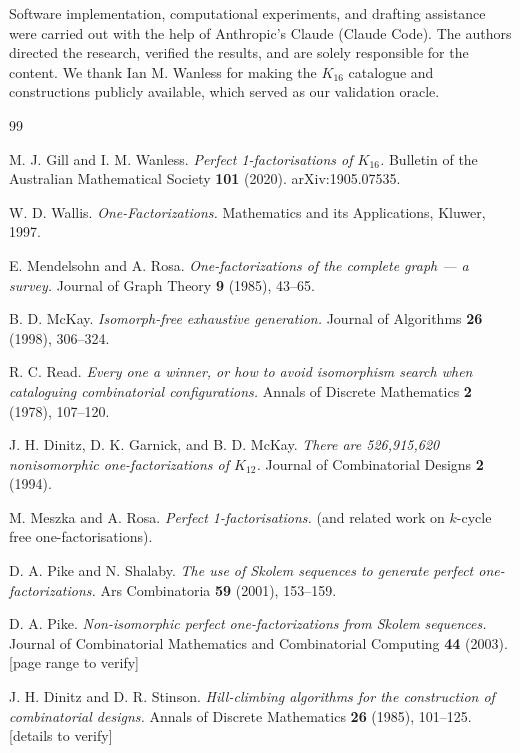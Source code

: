 \documentclass[11pt,reqno]{amsart}
\theoremstyle{plain}
\theoremstyle{definition}
\numberwithin{theorem}{section}
\begin{document}
Software implementation, computational experiments, and drafting assistance were
carried out with the help of Anthropic's Claude (Claude Code). The authors directed
the research, verified the results, and are solely responsible for the content. We
thank Ian M. Wanless for making the $K_{16}$ catalogue and constructions publicly
available, which served as our validation oracle.

\begin{thebibliography}{99}

 M. J. Gill and I. M. Wanless. \emph{Perfect 1-factorisations of $K_{16}$.} Bulletin of
the Australian Mathematical Society \textbf{101} (2020). arXiv:1905.07535.

 W. D. Wallis. \emph{One-Factorizations.} Mathematics and its Applications, Kluwer, 1997.

 E. Mendelsohn and A. Rosa. \emph{One-factorizations of the complete graph --- a survey.}
Journal of Graph Theory \textbf{9} (1985), 43--65.

 B. D. McKay. \emph{Isomorph-free exhaustive generation.} Journal of Algorithms \textbf{26}
(1998), 306--324.

 R. C. Read. \emph{Every one a winner, or how to avoid isomorphism search when
cataloguing combinatorial configurations.} Annals of Discrete Mathematics \textbf{2}
(1978), 107--120.

 J. H. Dinitz, D. K. Garnick, and B. D. McKay. \emph{There are 526,915,620 nonisomorphic
one-factorizations of $K_{12}$.} Journal of Combinatorial Designs \textbf{2} (1994).

 M. Meszka and A. Rosa. \emph{Perfect 1-factorisations.} (and related work on $k$-cycle
free one-factorisations).

 D. A. Pike and N. Shalaby. \emph{The use of Skolem sequences to generate perfect
one-factorizations.} Ars Combinatoria \textbf{59} (2001), 153--159.

 D. A. Pike. \emph{Non-isomorphic perfect one-factorizations from Skolem sequences.} Journal
of Combinatorial Mathematics and Combinatorial Computing \textbf{44} (2003). [page range to
verify]

 J. H. Dinitz and D. R. Stinson. \emph{Hill-climbing algorithms for the construction of
combinatorial designs.} Annals of Discrete Mathematics \textbf{26} (1985), 101--125.
[details to verify]


\end{thebibliography}
\end{document}
